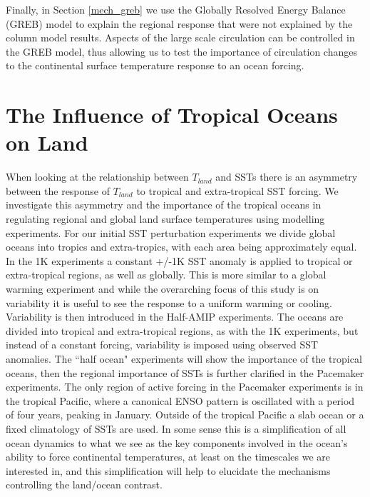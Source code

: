 Finally, in Section \ref{mech_greb} we use the Globally Resolved Energy Balance 
(GREB) model to explain the regional response that were not explained by the 
column model results. Aspects of the large scale circulation can be controlled 
in the GREB model, thus allowing us to test the importance of circulation 
changes to the continental surface temperature response to an ocean forcing.



\section{The Influence of Tropical Oceans on Land}
\label{mech_inftrop}

When looking at the relationship between $T_{land}$ and SSTs there is an 
asymmetry between the response of $T_{land}$ to tropical and extra-tropical SST 
forcing. We investigate this asymmetry and the importance of the tropical oceans 
in regulating regional and global land surface temperatures using modelling 
experiments. For our initial SST perturbation experiments we divide global 
oceans into tropics and extra-tropics, with each area being approximately equal.  
In the 1K experiments a constant +/-1K SST anomaly is applied to tropical or 
extra-tropical regions, as well as globally. This is more similar to a global 
warming experiment and while the overarching focus of this study is on 
variability it is useful to see the response to a uniform warming or cooling.  
Variability is then introduced in the Half-AMIP experiments. The oceans are 
divided into tropical and extra-tropical regions, as with the 1K experiments, 
but instead of a constant forcing, variability is imposed using observed SST 
anomalies. The ``half ocean" experiments will show the importance of the 
tropical oceans, then the regional importance of SSTs is further clarified in 
the Pacemaker experiments. The only region of active forcing in the Pacemaker 
experiments is in the tropical Pacific, where a canonical ENSO pattern is 
oscillated with a period of four years, peaking in January. Outside of the 
tropical Pacific a slab ocean or a fixed climatology of SSTs are used. In some 
sense this is a simplification of all ocean dynamics to what we see as the key 
components involved in the ocean's ability to force continental temperatures, at 
least on the timescales we are interested in, and this simplification will help 
to elucidate the mechanisms controlling the land/ocean contrast.

